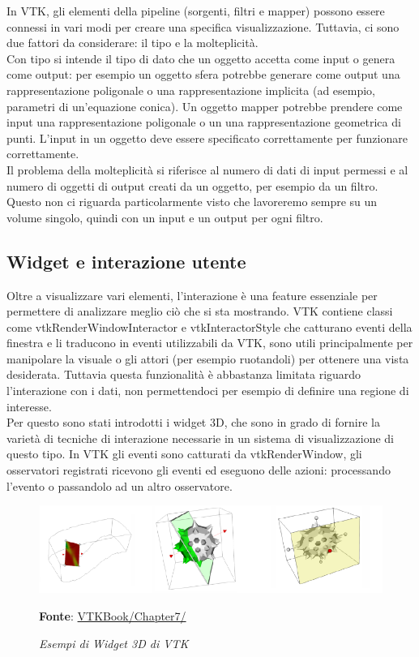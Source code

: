 In VTK, gli elementi della pipeline (sorgenti, filtri e mapper) possono essere connessi in vari modi per creare una specifica visualizzazione. Tuttavia, ci sono due fattori da considerare: il tipo e la molteplicità.\\
Con tipo si intende il tipo di dato che un oggetto accetta come input o genera come output: per esempio un oggetto sfera potrebbe generare come output una rappresentazione poligonale o una rappresentazione implicita (ad esempio, parametri di un'equazione conica). Un oggetto mapper potrebbe prendere come input una rappresentazione poligonale o un una rappresentazione geometrica di punti. L'input in un oggetto deve essere specificato correttamente per funzionare correttamente.
\\
Il problema della molteplicità si riferisce al numero di dati di input permessi e al numero di oggetti di output creati da un oggetto, per esempio da un filtro. Questo non ci riguarda particolarmente visto che lavoreremo sempre su un volume singolo, quindi con un input e un output per ogni filtro.

\subsection{Widget e interazione utente}\label{sec:widget-interazione}
Oltre a visualizzare vari elementi, l'interazione è una feature essenziale per permettere di analizzare meglio ciò che si sta mostrando. VTK contiene classi come vtkRenderWindowInteractor e vtkInteractorStyle che catturano eventi della finestra e li traducono in eventi utilizzabili da VTK, sono utili principalmente per manipolare la visuale o gli attori (per esempio ruotandoli) per ottenere una vista desiderata. Tuttavia questa funzionalità è abbastanza limitata riguardo l'interazione con i dati, non permettendoci per esempio di definire una regione di interesse.\\
Per questo sono stati introdotti i widget 3D, che sono in grado di fornire la varietà di tecniche di interazione necessarie in un sistema di visualizzazione di questo tipo. In VTK gli eventi sono catturati da vtkRenderWindow, gli osservatori registrati ricevono gli eventi ed eseguono delle azioni: processando l'evento o passandolo ad un altro osservatore.

\begin{figure}[h]
    \centering
    \includegraphics[scale=0.5]{immagini/volumerendering/widgets.png}
    \caption{\textit{Esempi di Widget 3D di VTK}}
    \textbf{Fonte}: \href{https://lorensen.github.io/VTKExamples/site/VTKBook/07Chapter7/}{VTKBook/Chapter7/}
    \label{fig: VTK 3D Widgets}
\end{figure}

